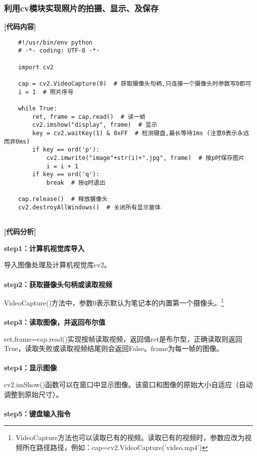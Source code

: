 \documentclass{article}
\begin{document}
\subsubsection{利用cv模块实现照片的拍摄、显示、及保存}
\textbf{[代码内容]}
\begin{lstlisting}
    #!/usr/bin/env python
    # -*- coding: UTF-8 -*-
    
    import cv2
    
    cap = cv2.VideoCapture(0)  # 获取摄像头句柄,只连接一个摄像头时参数写0即可
    i = 1  # 照片序号
    
    while True:
        ret, frame = cap.read()  # 读一帧
        cv2.imshow("display", frame)  # 显示
        key = cv2.waitKey(1) & 0xFF  # 检测键盘,最长等待1ms (注意0表示永远而非0ms)
        if key == ord('p'):
            cv2.imwrite("image"+str(i)+".jpg", frame)  # 按p时保存图片
            i = i + 1
        if key == ord('q'):
            break  # 按q时退出
    
    cap.release()  # 释放摄像头
    cv2.destroyAllWindows()  # 关闭所有显示窗体


\end{lstlisting}

\textbf{[代码分析]}

\textbf{step1：计算机视觉库导入}

导入图像处理及计算机视觉库cv2。
\\\hspace*{\fill}\\
\indent\textbf{step2：获取摄像头句柄或读取视频}

VideoCapture()方法中，参数0表示默认为笔记本的内置第一个摄像头。\footnote{VideoCapture方法也可以读取已有的视频。读取已有的视频时，参数应改为视频所在路径路径，例如：cap=cv2.VideoCapture('video.mp4')}
\\\hspace*{\fill}\\
\indent\textbf{step3：读取图像，并返回布尔值}

ret,frame=cap.read()实现按帧读取视频，返回值ret是布尔型，正确读取则返回True，读取失败或读取视频结尾则会返回False。frame为每一帧的图像。
\\\hspace*{\fill}\\
\indent\textbf{step4：显示图像}

cv2.imShow()函数可以在窗口中显示图像。该窗口和图像的原始大小自适应（自动调整到原始尺寸）。
\\\hspace*{\fill}\\
\indent\textbf{step5：键盘输入指令}
\end{document}
